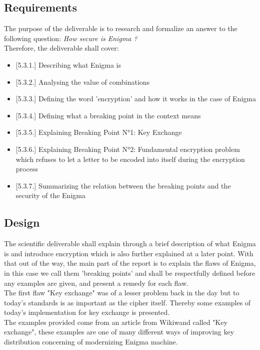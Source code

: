 \documentclass[conference,compsoc]{IEEEtran}
\begin{document}
\subsection{Requirements}
The purpose of the deliverable is to research and formalize an answer to the following question: \emph{How secure is Enigma ?}\\
Therefore, the deliverable shall cover:
\begin{itemize}
    \item{[5.3.1.]} Describing what Enigma is
    \item{[5.3.2.]} Analysing the value of combinations
    \item{[5.3.3.]} Defining the word 'encryption' and how it works in the case of Enigma
    \item{[5.3.4.]} Defining what a breaking point in the context means
    \item{[5.3.5.]} Explaining Breaking Point N°1: Key Exchange
    \item{[5.3.6.]} Explaining Breaking Point N°2: Fundamental encryption problem which refuses to let a letter to be encoded into itself during the encryption process
    \item{[5.3.7.]} Summarizing the relation between the breaking points and the security of the Enigma
\end{itemize}

\subsection{Design}
The scientific deliverable shall explain through a brief description of what Enigma is and introduce encryption which is also further explained at a later point. With that out of the way, the main part of the report is to explain the flaws of Enigma, in this case we call them 'breaking points' and shall be respectfully defined before any examples are given, and present a remedy for each flaw.\\

The first flaw "Key exchange" was of a lesser problem back in the day but to today's standards is as important as the cipher itself. Thereby some examples of today's implementation for key exchange is presented.\\
The examples provided come from an article from Wikiwand called "Key exchange", these examples are one of many different ways of improving key distribution concerning of modernizing Enigma machine.\\ 
\end{document}
